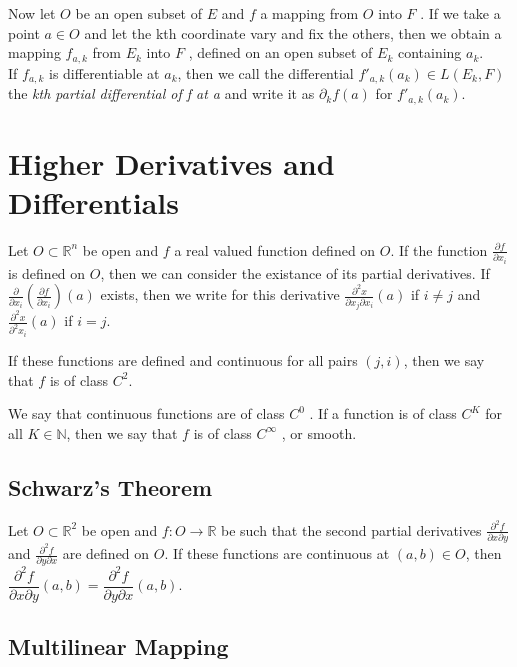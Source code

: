 \documentclass[12 pt]{article}
\theoremstyle{definition}
\theoremstyle{remark}
\newcommand{\R}{\mathbb{R}}
\newcommand{\N}{\mathbb{N}}
\begin{document}
Now let $O$ be an open subset of $E$ and $f$ a mapping from $O$ into $F$ . If we take a
point $a \in O$ and let the kth coordinate vary and fix the others, then we obtain a
mapping $f_{a,k}$ from $E_k$ into $F$ , defined on an open subset of $E_k$ containing $a_k$.\\

If $f_{a,k}$ is differentiable at $a_k$, then we call the differential $f'_{a,k}(a_k) \in L(E_k, F)$
the \textit{kth partial differential of f at a} and write it as $\partial_k f(a)$ for $f'_{a,k}(a_k)$. 

\section{Higher Derivatives and Differentials}

Let $O \subset \R^n$ be open and $f$ a real valued function defined on $O$. If the function $\frac{\partial f}{\partial x_i}$ is defined on $O$, then we can consider the existance of its partial derivatives. If $ \frac{\partial}{\partial x_i}(\frac{\partial f}{\partial x_i})(a)$ exists, then we write for this derivative $\frac{\partial^2 x}{\partial x_j \partial x_i}(a)$ if $i \neq j$ and $\frac{\partial^2 x}{\partial^2 x_i}(a)$ if $i = j$.

If these functions are defined and continuous for all pairs $(j,i)$, then we say that $f$ is of class $C^2$.

We say that continuous functions are of class $C^0$ . If a function is of class $C^K$ for all
$K \in \N$, then we say that $f$ is of class $C^{\infty}$ , or smooth.

\subsection{Schwarz’s Theorem}
\theorem Let $O \subset \R^2$ be open and $f: O \to \R$ be such that the second partial derivatives $\frac{\partial^2 f}{\partial x \partial y}$ and $\frac{\partial^2 f}{\partial y \partial x}$ are defined on $O$. If these functions are continuous at $(a,b) \in O$, then \\
\hspace*{3cm} $\dfrac{\partial^2 f}{\partial x \partial y}(a,b)= \dfrac{\partial^2 f}{\partial y \partial x}(a,b)$.

\subsection{Multilinear Mapping}
\normalfont
\end{document}

